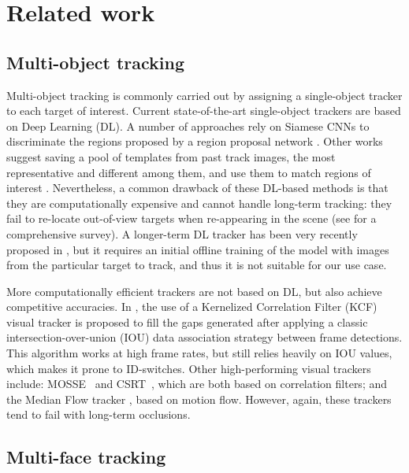 \section{Related work}


\subsection{Multi-object tracking}

Multi-object tracking is commonly carried out by assigning a single-object tracker to  each target of interest. Current state-of-the-art single-object trackers are based on Deep Learning (DL). A number of approaches rely on Siamese CNNs to discriminate the regions proposed by a region proposal network \cite{zhu2018dasiamrpn, li2019siamrpn++, wang2019siammask, voigtlaender2019trackingsegm}. Other works suggest saving a pool of templates from past track images, the most representative and different among them, and use them to match regions of interest \cite{sauer2019holistic}. Nevertheless, a common drawback of these DL-based methods is that they are computationally expensive and cannot handle long-term tracking: they fail to re-locate out-of-view targets when re-appearing in the scene (see \cite{lin2019mobiface} for a comprehensive survey). A longer-term DL tracker has been very recently proposed in \cite{wangtracking}, but it requires an initial offline training of the model with images from the particular target to track, and thus it is not suitable for our use case.

More computationally efficient trackers are not based on DL, but also achieve competitive accuracies. In \cite{bochinski2018viou}, the use of a Kernelized Correlation Filter (KCF) visual tracker is proposed to fill the gaps generated after applying a classic intersection-over-union (IOU) data association strategy between frame detections. This algorithm works at high frame rates, but still relies heavily on IOU values, which makes it prone to ID-switches. Other high-performing visual trackers include: MOSSE~\cite{bolme2010visual} and CSRT~\cite{lukezic2017discriminative}, which are both based on correlation filters; and the Median Flow tracker \cite{kalal2010forward}, based on motion flow. However, again, these trackers tend to fail with long-term occlusions.


\subsection{Multi-face tracking}

